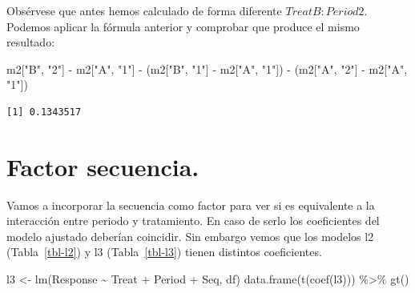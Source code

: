 \documentclass[
  12pt,
  a4paper,
  extrafontsizes,
  onecolumn,
  openright]{memoir}
\newenvironment{Shaded}{\begin{snugshade}}{\end{snugshade}}
\newcommand{\FunctionTok}[1]{\textcolor[rgb]{0.28,0.35,0.67}{#1}}
\newcommand{\NormalTok}[1]{\textcolor[rgb]{0.00,0.23,0.31}{#1}}
\newcommand{\OtherTok}[1]{\textcolor[rgb]{0.00,0.23,0.31}{#1}}
\newcommand{\SpecialCharTok}[1]{\textcolor[rgb]{0.37,0.37,0.37}{#1}}
\newcommand{\StringTok}[1]{\textcolor[rgb]{0.13,0.47,0.30}{#1}}
\begin{document}
Obsérvese que antes hemos calculado de forma diferente
\(TreatB:Period2\). Podemos aplicar la fórmula anterior y comprobar que
produce el mismo resultado:

\scriptsize

\begin{Shaded}
\begin{Highlighting}[]
\NormalTok{m2[}\StringTok{"B"}\NormalTok{, }\StringTok{"2"}\NormalTok{] }\SpecialCharTok{{-}}\NormalTok{ m2[}\StringTok{"A"}\NormalTok{, }\StringTok{"1"}\NormalTok{] }\SpecialCharTok{{-}}\NormalTok{ (m2[}\StringTok{"B"}\NormalTok{, }\StringTok{"1"}\NormalTok{] }\SpecialCharTok{{-}}\NormalTok{ m2[}\StringTok{"A"}\NormalTok{, }\StringTok{"1"}\NormalTok{]) }\SpecialCharTok{{-}}\NormalTok{ (m2[}\StringTok{"A"}\NormalTok{, }\StringTok{"2"}\NormalTok{] }\SpecialCharTok{{-}}\NormalTok{ m2[}\StringTok{"A"}\NormalTok{, }\StringTok{"1"}\NormalTok{])}
\end{Highlighting}
\end{Shaded}

\begin{verbatim}
[1] 0.1343517
\end{verbatim}

\normalsize

\hypertarget{factor-secuencia.}{%
\section{Factor secuencia.}\label{factor-secuencia.}}

Vamos a incorporar la secuencia como factor para ver si es equivalente a
la interacción entre periodo y tratamiento. En caso de serlo los
coeficientes del modelo ajustado deberían coincidir. Sin embargo vemos
que los modelos l2 (Tabla~\ref{tbl-l2}) y l3 (Tabla~\ref{tbl-l3}) tienen
distintos coeficientes.

\scriptsize

\begin{Shaded}
\begin{Highlighting}[]
\NormalTok{l3 }\OtherTok{\textless{}{-}} \FunctionTok{lm}\NormalTok{(Response }\SpecialCharTok{\textasciitilde{}}\NormalTok{ Treat }\SpecialCharTok{+}\NormalTok{ Period }\SpecialCharTok{+}\NormalTok{ Seq, df)}
\FunctionTok{data.frame}\NormalTok{(}\FunctionTok{t}\NormalTok{(}\FunctionTok{coef}\NormalTok{(l3))) }\SpecialCharTok{\%\textgreater{}\%} \FunctionTok{gt}\NormalTok{()}
\end{Highlighting}
\end{Shaded}
\end{document}
